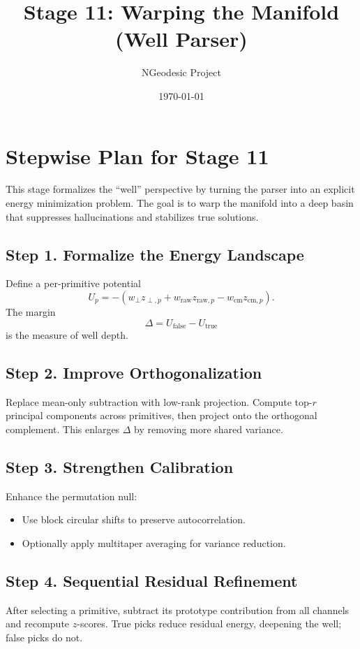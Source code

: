 \documentclass{article}
\title{Stage 11: Warping the Manifold (Well Parser)}
\author{NGeodesic Project}
\date{\today}
\begin{document}
\maketitle

\section*{Stepwise Plan for Stage 11}

This stage formalizes the ``well'' perspective by turning the parser into an explicit
energy minimization problem. The goal is to warp the manifold into a deep basin that
suppresses hallucinations and stabilizes true solutions.

\subsection*{Step 1. Formalize the Energy Landscape}
Define a per-primitive potential
\begin{equation}
U_p = -\left( w_\perp z_{\perp,p} + w_{\text{raw}} z_{\text{raw},p} - w_{\text{cm}} z_{\text{cm},p} \right).
\end{equation}
The margin
\begin{equation}
\Delta = U_{\text{false}} - U_{\text{true}}
\end{equation}
is the measure of well depth.

\subsection*{Step 2. Improve Orthogonalization}
Replace mean-only subtraction with low-rank projection. Compute top-$r$ principal
components across primitives, then project onto the orthogonal complement. This enlarges
$\Delta$ by removing more shared variance.

\subsection*{Step 3. Strengthen Calibration}
Enhance the permutation null:
\begin{itemize}
    \item Use block circular shifts to preserve autocorrelation.
    \item Optionally apply multitaper averaging for variance reduction.
\end{itemize}

\subsection*{Step 4. Sequential Residual Refinement}
After selecting a primitive, subtract its prototype contribution from all channels and
recompute $z$-scores. True picks reduce residual energy, deepening the well; false picks do not.
\end{document}
